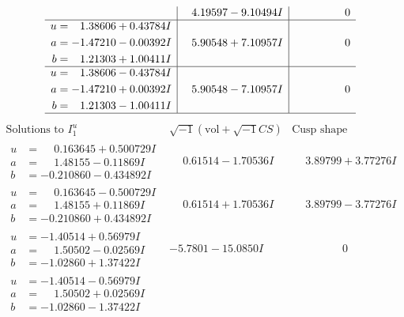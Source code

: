\documentclass[1p]{elsarticle_modified}
\theoremstyle{definition}
\newcommand{\I}{\sqrt{-1}}
\begin{document}
$$\begin{array}{c|c|c}
 & \phantom{-}4.19597 - 9.10494 I & \phantom{-0.000000 } 0 \\ \hline\begin{aligned}
u &= \phantom{-}1.38606 + 0.43784 I \\
a &= -1.47210 - 0.00392 I \\
b &= \phantom{-}1.21303 + 1.00411 I\end{aligned}
 & \phantom{-}5.90548 + 7.10957 I & \phantom{-0.000000 } 0 \\ \hline\begin{aligned}
u &= \phantom{-}1.38606 - 0.43784 I \\
a &= -1.47210 + 0.00392 I \\
b &= \phantom{-}1.21303 - 1.00411 I\end{aligned}
 & \phantom{-}5.90548 - 7.10957 I & \phantom{-0.000000 } 0\\
 \hline 
 \end{array}$$\newpage$$\begin{array}{c|c|c}  
\text{Solutions to }I^u_{1}& \I (\text{vol} + \sqrt{-1}CS) & \text{Cusp shape}\\
 \hline 
\begin{aligned}
u &= \phantom{-}0.163645 + 0.500729 I \\
a &= \phantom{-}1.48155 - 0.11869 I \\
b &= -0.210860 - 0.434892 I\end{aligned}
 & \phantom{-}0.61514 - 1.70536 I & \phantom{-}3.89799 + 3.77276 I \\ \hline\begin{aligned}
u &= \phantom{-}0.163645 - 0.500729 I \\
a &= \phantom{-}1.48155 + 0.11869 I \\
b &= -0.210860 + 0.434892 I\end{aligned}
 & \phantom{-}0.61514 + 1.70536 I & \phantom{-}3.89799 - 3.77276 I \\ \hline\begin{aligned}
u &= -1.40514 + 0.56979 I \\
a &= \phantom{-}1.50502 - 0.02569 I \\
b &= -1.02860 + 1.37422 I\end{aligned}
 & -5.7801 - 15.0850 I & \phantom{-0.000000 } 0 \\ \hline\begin{aligned}
u &= -1.40514 - 0.56979 I \\
a &= \phantom{-}1.50502 + 0.02569 I \\
b &= -1.02860 - 1.37422 I\end{aligned}

\end{array}$$
\end{document}
